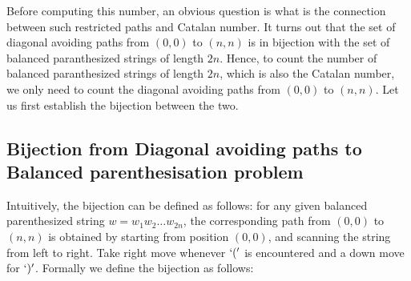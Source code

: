 Before computing this number, an obvious question is what is the connection between such restricted paths and Catalan number. It turns out that the set of diagonal avoiding paths from $(0,0)$ to $(n,n)$ is in bijection with the set of balanced paranthesized strings of length $2n$. Hence, to count the number of balanced paranthesized strings of length $2n$, which is also the Catalan number, we only need to count the diagonal avoiding paths from $(0,0)$ to $(n,n)$. Let us first establish the bijection between the two.

\subsection{Bijection from Diagonal avoiding paths to Balanced parenthesisation problem}
Intuitively, the bijection can be defined as follows: for any given balanced parenthesized string $w = w_1w_2\ldots w_{2n}$, the corresponding path from $(0,0)$ to $(n,n)$ is obtained by starting from position $(0,0)$, and scanning the string from left to right. Take  right move whenever $`('$ is encountered and a down move for $`)'$. Formally we define the bijection as follows:
\medskip{}

